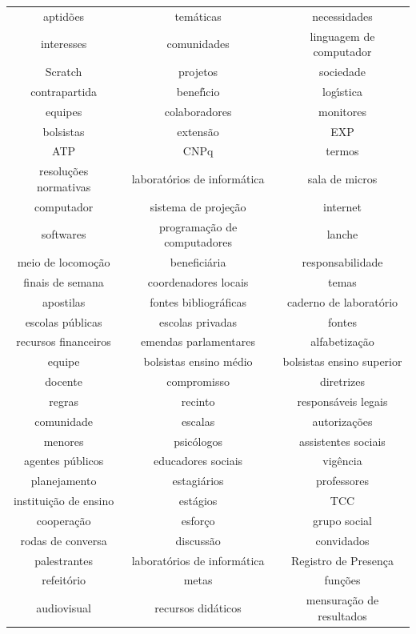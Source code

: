 \documentclass[
12pt,		%
openright,	%
twoside,  %
a4paper,			%
chapter=TITLE,		%
english,			%
french,				%
spanish,			%
brazil				%
]{USPSC-classe/USPSC}
\begin{document}
\begin{table}[htb]
\begin{tabular}{|c|c|c|}
aptid\~oes  &  tem\'aticas  &  necessidades \\
interesses  &  comunidades  &  linguagem de computador \\
Scratch  &  projetos  &  sociedade \\
contrapartida  &  benef\'{\i}cio  &  log\'{\i}stica \\
equipes  &  colaboradores  &  monitores \\
bolsistas  &  extens\~ao  &  EXP \\
ATP  &  CNPq  &  termos \\
resolu\c{c}\~oes normativas  &  laborat\'orios de inform\'atica  &  sala de micros  \\
computador  &  sistema de proje\c{c}\~ao  &  internet \\
softwares  &  programa\c{c}\~ao de computadores  &  lanche \\
meio de locomo\c{c}\~ao  &  benefici\'aria  &  responsabilidade \\
finais de semana  &  coordenadores locais  &  temas \\
apostilas  &  fontes bibliogr\'aficas  &  caderno de laborat\'orio \\
escolas p\'ublicas  &  escolas privadas  &  fontes \\
recursos financeiros  &  emendas parlamentares  &  alfabetiza\c{c}\~ao \\
equipe  &  bolsistas ensino m\'edio  &  bolsistas ensino superior \\
docente  &  compromisso  &  diretrizes \\
regras  &  recinto  &  respons\'aveis legais \\
comunidade  &  escalas  &  autoriza\c{c}\~oes \\
menores  &  psic\'ologos  &  assistentes sociais \\
agentes p\'ublicos  &  educadores sociais  &  vig\^encia \\
planejamento  &  estagi\'arios  &  professores \\
institui\c{c}\~ao de ensino  &  est\'agios  &  TCC \\
coopera\c{c}\~ao  &  esfor\c{c}o  &  grupo social \\
rodas de conversa  &  discuss\~ao  &  convidados \\
palestrantes  &  laborat\'orios de inform\'atica  &  Registro de Presen\c{c}a \\
refeit\'orio  &  metas  &  fun\c{c}\~oes \\
audiovisual  &  recursos did\'aticos  &  mensura\c{c}\~ao de resultados \\

\end{tabular}
\end{table}
\end{document}
